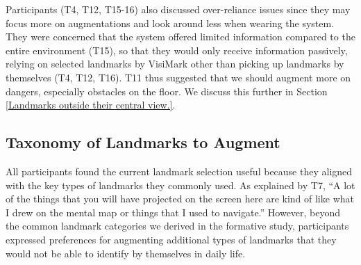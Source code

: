Participants (T4, T12, T15-16) also discussed over-reliance issues since they may focus more on augmentations and look around less when wearing the system. %
They were concerned that the system offered limited information compared to the entire environment (T15), so that they would only receive information passively, relying on selected landmarks by VisiMark other than picking up landmarks by themselves (T4, T12, T16). 
T11 thus suggested that we should augment more on dangers, especially obstacles on the floor. We discuss this further in Section \ref{Landmarks outside their central view.}.


\subsection{Taxonomy of Landmarks to Augment} 
All participants found the current landmark selection useful because they aligned with the key types of landmarks they commonly used. As explained by T7, ``A lot of the things that you will have projected on the screen here are kind of like what I drew on the mental map or things that I used to navigate.'' %
However, beyond the common landmark categories we derived in the formative study, participants expressed preferences for augmenting additional types of landmarks that they would not be able to identify by themselves in daily life. 



